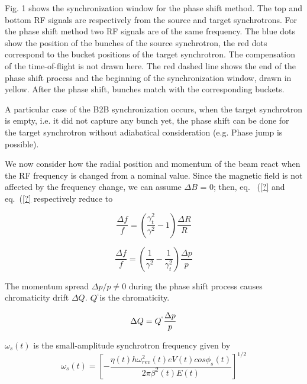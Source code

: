 Fig. 1 shows the synchronization window for the phase shift method. The top and bottom RF signals are respectively from the source and target synchrotrons. For the phase shift method two RF signals are of the same frequency. The blue dots show the position of the bunches of the source synchrotron, the red dots correspond to the bucket positions of the target synchrotron. The compensation of the time-of-flight is not drawn here. The red dashed line shows the end of the phase shift process and the beginning of the synchronization window, drawn in yellow. After the phase shift, bunches match with the corresponding buckets.  

A particular case of the B2B synchronization occurs, when the target synchrotron is empty, i.e. it did not capture any bunch yet, the phase shift can be done for the target synchrotron without adiabatical consideration (e.g. Phase jump is possible).

We now consider how the radial position and momentum of the beam react when the RF frequency is changed from a nominal value. Since the magnetic field is not affected by the frequency change, we can assume $\Delta{B}$ = 0; then, eq. ~(\ref{?}  and eq.~(\ref{?} respectively reduce to

\begin{equation}
\label{eq:phaseR}
\frac{\Delta{f}}{f} =({\frac{\gamma_t^2}{\gamma^2}-1}) \frac{\Delta{R}}{R}
\end{equation}

\begin{equation}
\frac{\Delta{f}}{f} = (\frac{1}{\gamma^2}-\frac{1}{\gamma_t^2})\frac{\Delta{p}}{p}
\label{eq:phaseP}
\end{equation}


The momentum spread ${\Delta{p}}/{p} \neq 0$ during the phase shift process causes chromaticity drift $\Delta{Q}$. $Q^`$is the chromaticity.

\begin{equation}
\Delta{Q} = Q^`\frac{\Delta{p}}{p}
\label{eq:chromaticity}
\end{equation} 

$\omega_s(t)$ is the small-amplitude synchrotron frequency given by
\begin{equation}
\omega_s(t) =[{-\frac{\eta(t)h\omega_{rev}^2(t)eV(t)cos{\phi_s(t)}}{2\pi\beta^2(t)E(t)}}]^{1/2}
\label{eq:synchfreq}
\end{equation} 

